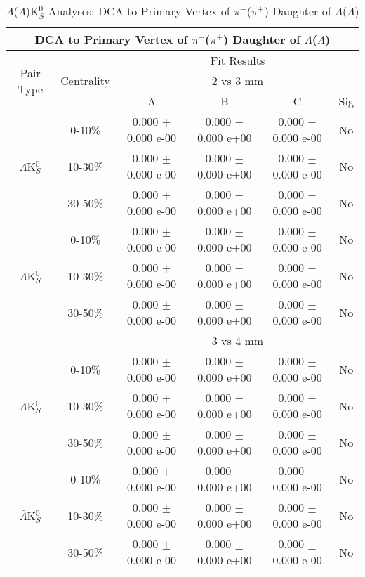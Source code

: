 \documentclass[../AnalysisNoteJBuxton.tex]{subfiles}
\begin{document}
\begin{table}
 \centering
 \begin{tabular}{|c|c|c|c|c|c|}
  \multicolumn{6}{c}{DCA to Primary Vertex of $\pi^{-}$($\pi^{+}$) Daughter of $\Lambda$($\bar{\Lambda}$)} \\
  \hline
  \multirow{3}{*}{Pair Type} & \multirow{3}{*}{Centrality} & \multicolumn{4}{c|}{Fit Results} \\
  \cline{3-6}
   & & \multicolumn{4}{c|}{2 vs 3 mm} \\
  \cline{3-6}
   & & A & B & C & Sig \\
  \hline  
  \multirow{3}{*}{$\Lambda$K$^{0}_{S}$}
   &  0-10\% & 0.000 $\pm$ 0.000 e-00 & 0.000 $\pm$ 0.000 e+00 & 0.000 $\pm$ 0.000 e-00 & No \\
   & 10-30\% & 0.000 $\pm$ 0.000 e-00 & 0.000 $\pm$ 0.000 e+00 & 0.000 $\pm$ 0.000 e-00 & No \\
   & 30-50\% & 0.000 $\pm$ 0.000 e-00 & 0.000 $\pm$ 0.000 e+00 & 0.000 $\pm$ 0.000 e-00 & No \\
  \hline
  \multirow{3}{*}{$\bar{\Lambda}$K$^{0}_{S}$}  
   &  0-10\% & 0.000 $\pm$ 0.000 e-00 & 0.000 $\pm$ 0.000 e+00 & 0.000 $\pm$ 0.000 e-00 & No \\
   & 10-30\% & 0.000 $\pm$ 0.000 e-00 & 0.000 $\pm$ 0.000 e+00 & 0.000 $\pm$ 0.000 e-00 & No \\
   & 30-50\% & 0.000 $\pm$ 0.000 e-00 & 0.000 $\pm$ 0.000 e+00 & 0.000 $\pm$ 0.000 e-00 & No \\
  \hline 
  \multicolumn{2}{|c|}{} & \multicolumn{4}{c|}{3 vs 4 mm} \\
  \hline  
  \multirow{3}{*}{$\Lambda$K$^{0}_{S}$}   
   &  0-10\% & 0.000 $\pm$ 0.000 e-00 & 0.000 $\pm$ 0.000 e+00 & 0.000 $\pm$ 0.000 e-00 & No \\
   & 10-30\% & 0.000 $\pm$ 0.000 e-00 & 0.000 $\pm$ 0.000 e+00 & 0.000 $\pm$ 0.000 e-00 & No \\
   & 30-50\% & 0.000 $\pm$ 0.000 e-00 & 0.000 $\pm$ 0.000 e+00 & 0.000 $\pm$ 0.000 e-00 & No \\
  \hline  
  \multirow{3}{*}{$\bar{\Lambda}$K$^{0}_{S}$}
   &  0-10\% & 0.000 $\pm$ 0.000 e-00 & 0.000 $\pm$ 0.000 e+00 & 0.000 $\pm$ 0.000 e-00 & No \\
   & 10-30\% & 0.000 $\pm$ 0.000 e-00 & 0.000 $\pm$ 0.000 e+00 & 0.000 $\pm$ 0.000 e-00 & No \\
   & 30-50\% & 0.000 $\pm$ 0.000 e-00 & 0.000 $\pm$ 0.000 e+00 & 0.000 $\pm$ 0.000 e-00 & No \\
  \hline
 \end{tabular}
 \caption{$\Lambda$($\bar{\Lambda}$)K$^{0}_{S}$ Analyses: DCA to Primary Vertex of $\pi^{-}$($\pi^{+}$) Daughter of $\Lambda$($\bar{\Lambda}$)}
 \label{tab:DcaToPrimVertexPionDaughtOfLamLamK0Full}
\end{table}
\end{document}
